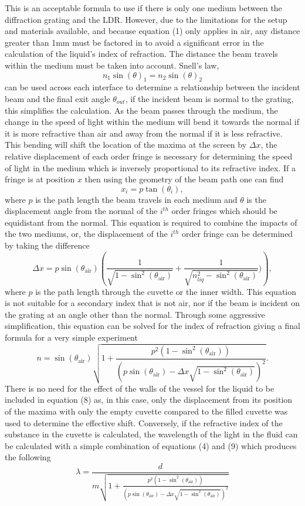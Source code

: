\documentclass[11pt]{article}
\begin{document}
    This is an acceptable formula to use if there is only one medium between
the diffraction grating and the LDR. However, due to the limitations for
the setup and materials available, and because equation (1) only applies
in air, any distance greater than 1mm must be factored in to avoid a
significant error in the calculation of the liquid's index of
refraction. The distance the beam travels within the medium must be
taken into account. Snell's law,
\[n_1 \sin(\theta)_1 = n_2 \sin(\theta)_2 \tag{6} \] can be used across
each interface to determine a relationship between the incident beam and
the final exit angle \(\theta_{out}\), if the incident beam is normal to
the grating, this simplifies the calculation. As the beam passes through
the medium, the change in the speed of light within the medium will bend
it towards the normal if it is more refractive than air and away from
the normal if it is less refractive. This bending will shift the
location of the maxima at the screen by \(\Delta x\), the relative
displacement of each order fringe is necessary for determining the speed
of light in the medium which is inversely proportional to its refractive
index. If a fringe is at position \(x\) then using the geometry of the
beam path one can find \[ x_i = p \tan (\theta_i), \tag{7}\] where \(p\)
is the path length the beam travels in each medium and \(\theta\) is the
displacement angle from the normal of the \(i^{th}\) order fringes which
should be equidistant from the normal. This equation is required to
combine the impacts of the two mediums, or, the displacement of the
\(i^{th}\) order fringe can be determined by taking the difference
\[ \Delta x = p \sin( \theta_{\text{air}} ) \left( \frac{1}{ \sqrt{1 - \sin^2 ( \theta_{\text{air}} ) }} + \frac{1}{ \sqrt{n_{liq}^2 - \sin^2 ( \theta_{\text{air}} ) }})\right) \tag{8},\]
where \(p\) is the path length through the cuvette or the inner width.
This equation is not suitable for a secondary index that is not air, nor
if the beam is incident on the grating at an angle other than the
normal. Through some aggressive simplification, this equation can be
solved for the index of refraction giving a final formula for a very
simple experiment
\[ n = \sin \left( \theta_{ \text{air}} \right) \sqrt{ 1 +  \frac{p^2 \left( 1 - \sin^2 \left( \theta_{ \text{air}} \right) \right) }{ \left( p \sin \left( \theta_{ \text{air}} \right) - \Delta x \sqrt{ 1 - \sin^2 \left( \theta_{ \text{air}} \right)} \right) ^2}}. \tag{9}\]
There is no need for the effect of the walls of the vessel for the
liquid to be included in equation (8) as, in this case, only the
displacement from its position of the maxima with only the empty cuvette
compared to the filled cuvette was used to determine the effective
shift. Conversely, if the refractive index of the substance in the
cuvette is calculated, the wavelength of the light in the fluid can be
calculated with a simple combination of equations (4) and (9) which
produces the following
\[ \lambda = \frac{d}{m \sqrt{ 1 +  \frac{p^2 \left( 1 - \sin^2 \left( \theta_{ \text{air}} \right) \right) }{ \left( p \sin \left( \theta_{ \text{air}} \right) - \Delta x \sqrt{ 1 - \sin^2 \left( \theta_{ \text{air}} \right)} \right) ^2}}} \tag{10}\]
\end{document}
